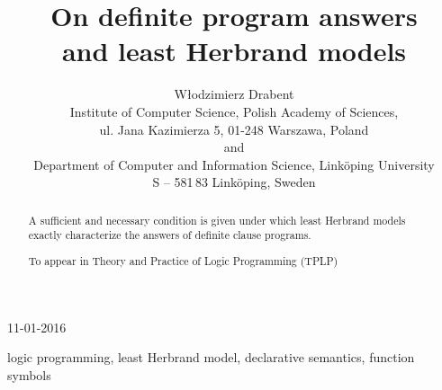 \documentclass[a4paper]{tlp2}
\begin{document}
\title 
[Program answers and least Herbrand models]
{On definite program answers \\ and least Herbrand models}



\author[W. Drabent]
{W{\l}odzimierz Drabent\\
         Institute of Computer Science,
         Polish Academy of Sciences,\\
         ul. Jana Kazimierza 5,
         01-248 Warszawa, Poland
         \\ and \\
Department of Computer and Information Science,
         Link\"oping University\\
         S -- 581\,83   Link\"oping, Sweden      \\
}



\submitted
{11-01-2016}









\maketitle

\begin{abstract}
A sufficient and necessary condition 
is given under which least Herbrand models exactly characterize the answers
of definite clause programs. 

To appear in Theory and Practice of Logic Programming (TPLP)
\end{abstract}

\begin{keywords}
logic programming, least Herbrand model, declarative semantics, function symbols
\end{keywords}
\end{document}
